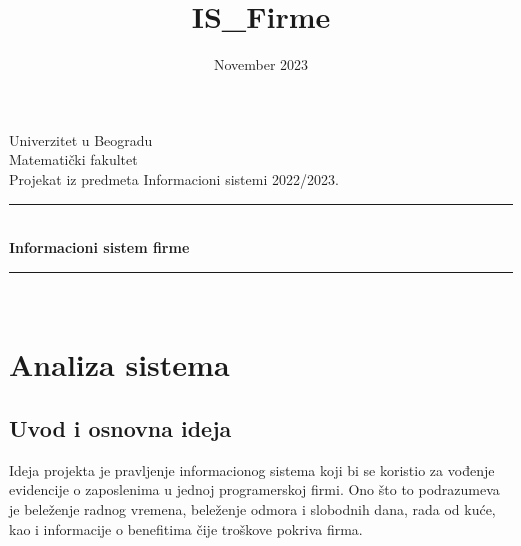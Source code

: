 \documentclass[a4paper]{article}
\title{IS_Firme}
\date{November 2023}
\begin{document}
\begin{titlepage}
    \centering

    \newcommand{\HRule}{\rule{\linewidth}{0.5mm}}
    \center
    \textup{\Large Univerzitet u Beogradu\\Matematički fakultet}\\[1.5cm]
    \textup{\Large Projekat iz predmeta Informacioni sistemi 2022/2023.}\\[0.4cm]

    \HRule \\[0.4cm]
    { \huge \bfseries Informacioni sistem firme}\\[0.4cm]
    \HRule \\[1.1cm]
\end{titlepage}

\newpage
\renewcommand*\contentsname{Sadržaj:}
\tableofcontents

\newpage
\section{Analiza sistema}
\subsection{Uvod i osnovna ideja}
Ideja projekta je pravljenje informacionog sistema koji bi se koristio za vođenje evidencije o zaposlenima u jednoj programerskoj firmi. Ono što to podrazumeva je beleženje radnog vremena, beleženje odmora i slobodnih dana, rada od kuće, kao i informacije o benefitima čije troškove pokriva firma.
\end{document}
